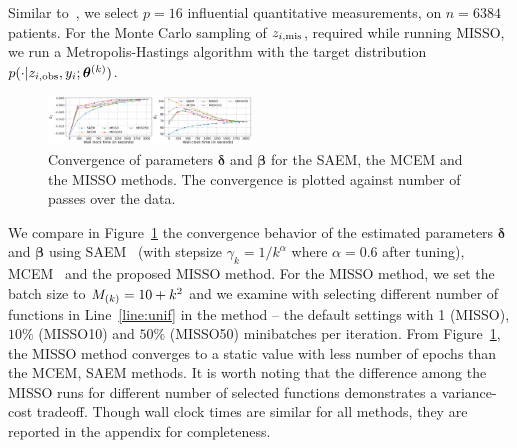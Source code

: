 \documentclass{article}
\begin{document}
Similar to~\cite{jiang2018logistic}, we select $p = 16$ influential quantitative measurements, on $n = 6384$ patients.
For the Monte Carlo sampling of $z_{i,\mis}$, required while running MISSO, we run a Metropolis-Hastings algorithm with the target distribution $p( \cdot |z_{i,\obs}, y_i; \hp{k})$.

\begin{figure}[H]
\includegraphics[width=0.48\textwidth]{pic_paper/traumabasenoexp_wallclock.png}\vspace{-.2cm}
\caption{Convergence of parameters ${\bm \delta}$ and ${\bm \beta}$ for the SAEM, the MCEM and the MISSO methods. The convergence is plotted against number of passes over the data.}\vspace{-.2cm}
\label{fig:misso_trauma}
\end{figure}
\vspace{-.2cm}
We compare in Figure~\ref{fig:misso_trauma} the convergence behavior of the estimated parameters $\bm{\delta}$ and $\bm{\beta}$ using SAEM~\cite{delyon1999} (with stepsize $\gamma_k = 1/k^{\alpha}$ where $\alpha = 0.6$ after tuning), MCEM~\cite{wei1990mcem}  and the proposed MISSO method.
For the MISSO method, we set the batch size to $\Bsize{k} = 10 + k^2$ and we examine with selecting different number of functions in Line~\ref{line:unif} in the method -- the default settings with 1 (MISSO), $10\%$ (MISSO10) and $50\%$ (MISSO50) minibatches per iteration.
From Figure~\ref{fig:misso_trauma}, the MISSO method converges to a static value with less number of epochs than the MCEM, SAEM methods.
It is worth noting that the difference among the MISSO runs for different number of selected functions demonstrates a variance-cost tradeoff.
Though wall clock times are similar for all methods, they are reported in the appendix for completeness.
\end{document}
